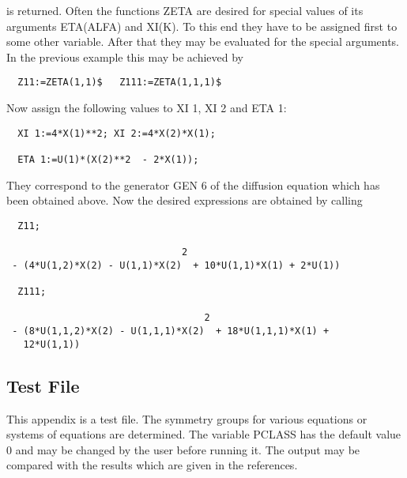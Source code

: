 is returned. Often the functions ZETA are desired for special values
of its arguments ETA(ALFA) and XI(K). To this end they have to be
assigned first to some other variable. After that they may be
evaluated for the special arguments. In the previous example this may
be achieved by

\begin{verbatim}
  Z11:=ZETA(1,1)$   Z111:=ZETA(1,1,1)$
\end{verbatim}

Now assign the following values to XI 1, XI 2 and ETA 1:

\begin{verbatim}
  XI 1:=4*X(1)**2; XI 2:=4*X(2)*X(1);

  ETA 1:=U(1)*(X(2)**2  - 2*X(1));
\end{verbatim}

They correspond to the generator GEN 6 of the diffusion equation which
has been obtained above. Now the desired expressions are obtained by
calling

\begin{verbatim}
  Z11;

                               2
 - (4*U(1,2)*X(2) - U(1,1)*X(2)  + 10*U(1,1)*X(1) + 2*U(1))

  Z111;

                                   2
 - (8*U(1,1,2)*X(2) - U(1,1,1)*X(2)  + 18*U(1,1,1)*X(1) +
   12*U(1,1))
\end{verbatim}


\subsection{Test File}

This appendix is a test file. The symmetry groups for various
equations or systems of equations are determined. The variable PCLASS
has the default value 0 and may be changed by the user before running
it. The output may be compared with the results which are given in the
references.

